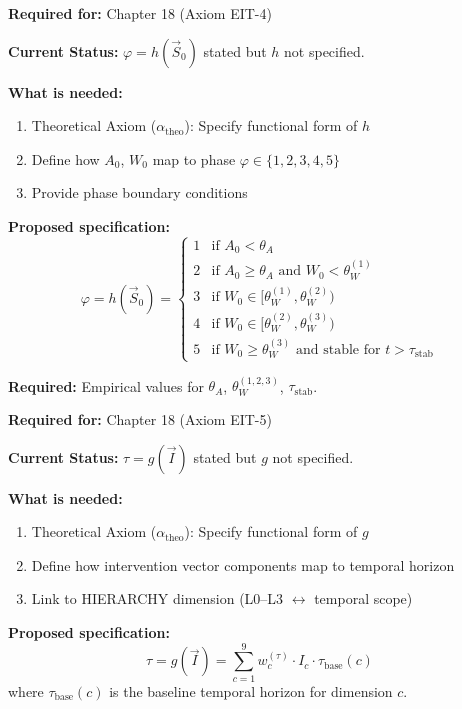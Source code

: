 \begin{tcolorbox}[colback=yellow!5!white, colframe=yellow!75!black,
    title=\textbf{TODO-UNMAPPED_IE-4: Journey Emergence Function $h(\vec{S}_0)$}]

\textbf{Required for:} Chapter 18 (Axiom EIT-4)

\textbf{Current Status:} $\varphi = h(\vec{S}_0)$ stated but $h$ not specified.

\textbf{What is needed:}
\begin{enumerate}[nosep]
    \item Theoretical Axiom ($\alpha_{\text{theo}}$): Specify functional form of $h$
    \item Define how $A_0$, $W_0$ map to phase $\varphi \in \{1,2,3,4,5\}$
    \item Provide phase boundary conditions
\end{enumerate}

\textbf{Proposed specification:}
\[
\varphi = h(\vec{S}_0) = \begin{cases}
1 & \text{if } A_0 < \theta_A \\
2 & \text{if } A_0 \geq \theta_A \text{ and } W_0 < \theta_W^{(1)} \\
3 & \text{if } W_0 \in [\theta_W^{(1)}, \theta_W^{(2)}) \\
4 & \text{if } W_0 \in [\theta_W^{(2)}, \theta_W^{(3)}) \\
5 & \text{if } W_0 \geq \theta_W^{(3)} \text{ and stable for } t > \tau_{\text{stab}}
\end{cases}
\]

\textbf{Required:} Empirical values for $\theta_A$, $\theta_W^{(1,2,3)}$, $\tau_{\text{stab}}$.

\end{tcolorbox}

\begin{tcolorbox}[colback=yellow!5!white, colframe=yellow!75!black,
    title=\textbf{TODO-UNMAPPED_IE-5: Effect-Horizon Function $g(\vec{I})$}]

\textbf{Required for:} Chapter 18 (Axiom EIT-5)

\textbf{Current Status:} $\tau = g(\vec{I})$ stated but $g$ not specified.

\textbf{What is needed:}
\begin{enumerate}[nosep]
    \item Theoretical Axiom ($\alpha_{\text{theo}}$): Specify functional form of $g$
    \item Define how intervention vector components map to temporal horizon
    \item Link to HIERARCHY dimension (L0--L3 $\leftrightarrow$ temporal scope)
\end{enumerate}

\textbf{Proposed specification:}
\[
\tau = g(\vec{I}) = \sum_{c=1}^{9} w_c^{(\tau)} \cdot I_c \cdot \tau_{\text{base}}(c)
\]
where $\tau_{\text{base}}(c)$ is the baseline temporal horizon for dimension $c$.

\end{tcolorbox}

